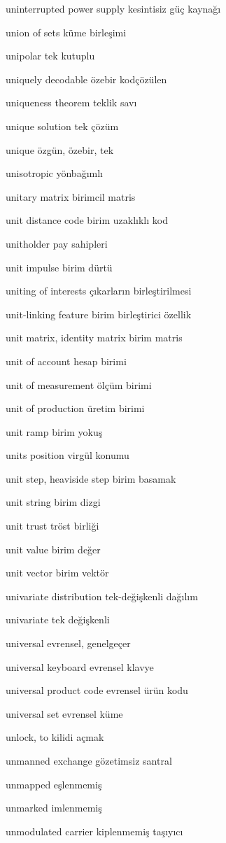 \documentclass[12pt,fleqn]{article}\usepackage{../../common}
\begin{document}
uninterrupted power supply kesintisiz güç kaynağı

union of sets küme birleşimi

unipolar tek kutuplu

uniquely decodable özebir kodçözülen

uniqueness theorem teklik savı

unique solution tek çözüm

unique özgün, özebir, tek

unisotropic yönbağımlı

unitary matrix birimcil matris

unit distance code birim uzaklıklı kod

unitholder pay sahipleri

unit impulse birim dürtü

uniting of interests çıkarların birleştirilmesi

unit-linking feature birim birleştirici özellik

unit matrix, identity matrix birim matris

unit of account hesap birimi

unit of measurement ölçüm birimi

unit of production üretim birimi

unit ramp birim yokuş

units position virgül konumu

unit step, heaviside step birim basamak

unit string birim dizgi

unit trust tröst birliği

unit value birim değer

unit vector birim vektör

univariate distribution tek-değişkenli dağılım

univariate tek değişkenli

universal evrensel, genelgeçer

universal keyboard evrensel klavye

universal product code evrensel ürün kodu

universal set evrensel küme

unlock, to kilidi açmak

unmanned exchange gözetimsiz santral

unmapped eşlenmemiş

unmarked imlenmemiş

unmodulated carrier kiplenmemiş taşıyıcı
\end{document}
